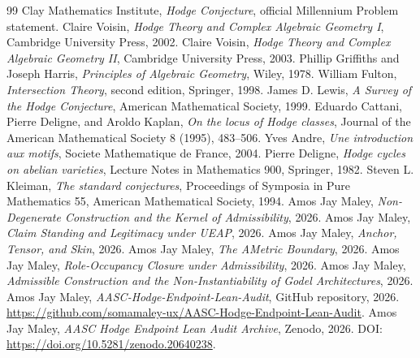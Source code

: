 \documentclass[11pt]{article}
\begin{document}
\begin{thebibliography}{99}
 Clay Mathematics Institute, \emph{Hodge Conjecture}, official Millennium Problem statement.
 Claire Voisin, \emph{Hodge Theory and Complex Algebraic Geometry I}, Cambridge University Press, 2002.
 Claire Voisin, \emph{Hodge Theory and Complex Algebraic Geometry II}, Cambridge University Press, 2003.
 Phillip Griffiths and Joseph Harris, \emph{Principles of Algebraic Geometry}, Wiley, 1978.
 William Fulton, \emph{Intersection Theory}, second edition, Springer, 1998.
 James D. Lewis, \emph{A Survey of the Hodge Conjecture}, American Mathematical Society, 1999.
 Eduardo Cattani, Pierre Deligne, and Aroldo Kaplan, \emph{On the locus of Hodge classes}, Journal of the American Mathematical Society 8 (1995), 483--506.
 Yves Andre, \emph{Une introduction aux motifs}, Societe Mathematique de France, 2004.
 Pierre Deligne, \emph{Hodge cycles on abelian varieties}, Lecture Notes in Mathematics 900, Springer, 1982.
 Steven L. Kleiman, \emph{The standard conjectures}, Proceedings of Symposia in Pure Mathematics 55, American Mathematical Society, 1994.
 Amos Jay Maley, \emph{Non-Degenerate Construction and the Kernel of Admissibility}, 2026.
 Amos Jay Maley, \emph{Claim Standing and Legitimacy under UEAP}, 2026.
 Amos Jay Maley, \emph{Anchor, Tensor, and Skin}, 2026.
 Amos Jay Maley, \emph{The AMetric Boundary}, 2026.
 Amos Jay Maley, \emph{Role-Occupancy Closure under Admissibility}, 2026.
 Amos Jay Maley, \emph{Admissible Construction and the Non-Instantiability of Godel Architectures}, 2026.
 Amos Jay Maley, \emph{AASC-Hodge-Endpoint-Lean-Audit}, GitHub repository, 2026. \url{https://github.com/somamaley-ux/AASC-Hodge-Endpoint-Lean-Audit}.
 Amos Jay Maley, \emph{AASC Hodge Endpoint Lean Audit Archive}, Zenodo, 2026. DOI: \url{https://doi.org/10.5281/zenodo.20640238}.
\end{thebibliography}
\end{document}
